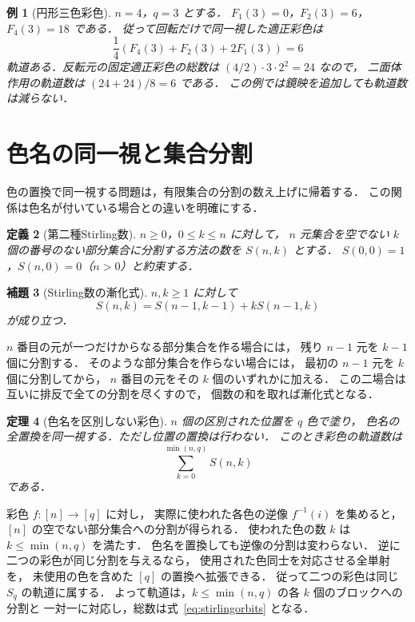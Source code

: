 \documentclass[a5paper,10pt,onecolumn]{jsarticle}
\makeatletter
\theoremstyle{mathnotetheorem}
\newtheorem{theorem}{定理}[section]
\newtheorem{definition}[theorem]{定義}
\newtheorem{lemma}[theorem]{補題}
\newtheorem{example}[theorem]{例}
\renewcommand{\proofname}{証明}
\renewenvironment{proof}[1][\proofname]{%
  \par\pushQED{\qed}\normalfont\topsep4\p@\@plus2\p@\relax
  \trivlist\item[\hskip\labelsep\bfseries #1]\ignorespaces
}{\popQED\endtrivlist\@endpefalse}
\makeatother
\begin{document}
\begin{example}[円形三色彩色]
$n=4$，$q=3$ とする．
$F_1(3)=0$，$F_2(3)=6$，$F_4(3)=18$ である．
従って回転だけで同一視した適正彩色は
\[
 \frac14(F_4(3)+F_2(3)+2F_1(3))=6
\]
軌道ある．反転元の固定適正彩色の総数は
$(4/2)\cdot3\cdot2^2=24$ なので，
二面体作用の軌道数は $(24+24)/8=6$ である．
この例では鏡映を追加しても軌道数は減らない．
\end{example}

\section{色名の同一視と集合分割}
色の置換で同一視する問題は，有限集合の分割の数え上げに帰着する．
この関係は色名が付いている場合との違いを明確にする．

\begin{definition}[第二種Stirling数]
$n\ge0$，$0\le k\le n$ に対して，
$n$ 元集合を空でない $k$ 個の番号のない部分集合に分割する方法の数を
$S(n,k)$ とする．
$S(0,0)=1$，$S(n,0)=0$（$n>0$）と約束する．
\end{definition}

\begin{lemma}[Stirling数の漸化式]\label{lem:stirling}
$n,k\ge1$ に対して
\[
 S(n,k)=S(n-1,k-1)+kS(n-1,k)
\]
が成り立つ．
\end{lemma}
\begin{proof}
$n$ 番目の元が一つだけからなる部分集合を作る場合には，
残り $n-1$ 元を $k-1$ 個に分割する．
そのような部分集合を作らない場合には，
最初の $n-1$ 元を $k$ 個に分割してから，
$n$ 番目の元をその $k$ 個のいずれかに加える．
この二場合は互いに排反で全ての分割を尽くすので，
個数の和を取れば漸化式となる．
\end{proof}

\begin{theorem}[色名を区別しない彩色]\label{thm:colorsunlabeled}
$n$ 個の区別された位置を $q$ 色で塗り，
色名の全置換を同一視する．ただし位置の置換は行わない．
このとき彩色の軌道数は
\begin{equation}\label{eq:stirlingorbits}
 \sum_{k=0}^{\min(n,q)}S(n,k)
\end{equation}
である．
\end{theorem}
\begin{proof}
彩色 $f:[n]\to[q]$ に対し，
実際に使われた各色の逆像 $f^{-1}(i)$ を集めると，
$[n]$ の空でない部分集合への分割が得られる．
使われた色の数 $k$ は $k\le\min(n,q)$ を満たす．
色名を置換しても逆像の分割は変わらない．
逆に二つの彩色が同じ分割を与えるなら，
使用された色同士を対応させる全単射を，
未使用の色を含めた $[q]$ の置換へ拡張できる．
従って二つの彩色は同じ $S_q$ の軌道に属する．
よって軌道は，$k\le\min(n,q)$ の各 $k$ 個のブロックへの分割と
一対一に対応し，総数は式~\eqref{eq:stirlingorbits} となる．
\end{proof}
\end{document}
